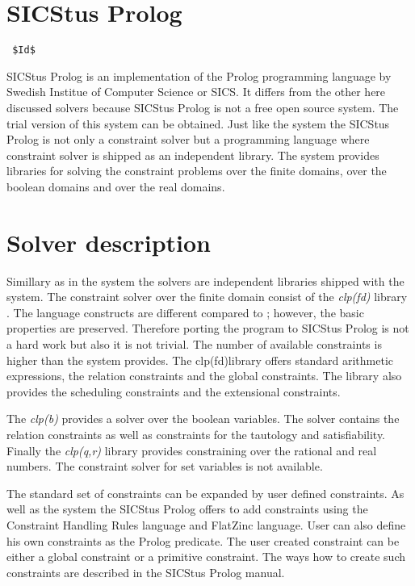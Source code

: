 \section{SICStus Prolog}
\verb= $Id$ =

SICStus Prolog is an implementation of the Prolog programming language by Swedish
Institue of Computer Science or SICS. It differs from the other here discussed solvers 
because SICStus Prolog is not a free open source system. The trial version of this
system can be obtained. Just like the \eclipse system the SICStus Prolog is not only
a constraint solver but a programming language where constraint solver is shipped as 
an independent library. The system provides libraries for solving the constraint problems
over the finite domains, over the boolean domains and over the real domains.

\section{Solver description}
Simillary as in the \eclipse system the solvers are independent libraries shipped 
with the system. The constraint solver over the finite domain consist of the
{\em clp(fd)} library \cite{Carlsson97anopen-ended}. The language constructs are different
compared to \eclipse; however, the basic properties are preserved. Therefore porting
the \eclipse program to SICStus Prolog is not a hard work but also it is not trivial.
The number of available constraints is higher than the \eclipse system provides.
The clp(fd)library offers standard arithmetic expressions, the relation constraints
and the global constraints. The library also provides the scheduling constraints and 
the extensional constraints.

The {\em clp(b)} provides a solver over the boolean variables. The solver contains
the relation constraints as well as constraints for the tautology and satisfiability.
Finally the {\em clp(q,r)} library \cite{clpqr:opai} provides constraining over the 
rational and real numbers. The constraint solver for set variables is not available.

The standard set of constraints can be expanded by user defined constraints. As well as the
\eclipse system the SICStus Prolog offers to add constraints using the Constraint Handling
Rules language and FlatZinc language. User can also define his own constraints as the
Prolog predicate. The user created constraint can be either a global constraint or
a primitive constraint. The ways how to create such constraints are described in 
the SICStus Prolog manual.

